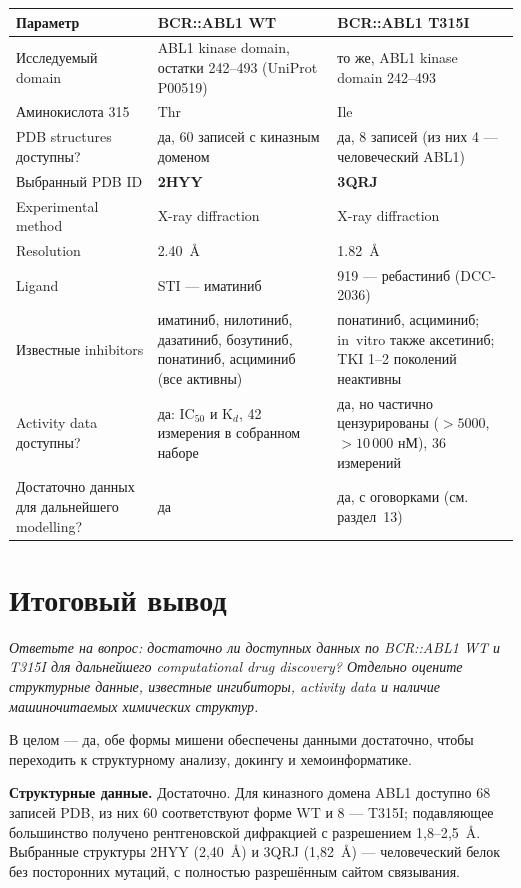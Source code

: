 \documentclass[11pt,a4paper]{article}
\newcommand{\instr}[1]{{\small\itshape #1\par}}
\begin{document}
\begin{center}
\begin{tabular}{|L{4.3cm}|L{5.4cm}|L{5.4cm}|}
\hline
\textbf{Параметр} & \textbf{BCR::ABL1 WT} & \textbf{BCR::ABL1 T315I} \\
\hline
Исследуемый domain & ABL1 kinase domain, остатки 242--493 (UniProt P00519) &
то же, ABL1 kinase domain 242--493 \\
\hline
Аминокислота 315 & Thr & Ile \\
\hline
PDB structures доступны? & да, 60 записей с киназным доменом &
да, 8 записей (из них 4 --- человеческий ABL1) \\
\hline
Выбранный PDB ID & \textbf{2HYY} & \textbf{3QRJ} \\
\hline
Experimental method & X-ray diffraction & X-ray diffraction \\
\hline
Resolution & 2.40~\AA & 1.82~\AA \\
\hline
Ligand & STI --- иматиниб & 919 --- ребастиниб (DCC-2036) \\
\hline
Известные inhibitors & иматиниб, нилотиниб, дазатиниб, бозутиниб, понатиниб, асциминиб
(все активны) & понатиниб, асциминиб; in~vitro также аксетиниб; TKI 1--2 поколений
неактивны \\
\hline
Activity data доступны? & да: IC$_{50}$ и K$_d$, 42 измерения в собранном наборе &
да, но частично цензурированы ($>5000$, $>10\,000$ нМ), 36 измерений \\
\hline
Достаточно данных для дальнейшего modelling? & да & да, с оговорками (см. раздел~13) \\
\hline
\end{tabular}
\end{center}

\section{Итоговый вывод}
\instr{Ответьте на вопрос: достаточно ли доступных данных по BCR::ABL1 WT и T315I для
дальнейшего computational drug discovery? Отдельно оцените структурные данные, известные
ингибиторы, activity data и наличие машиночитаемых химических структур.}

В целом --- да, обе формы мишени обеспечены данными достаточно, чтобы переходить к
структурному анализу, докингу и хемоинформатике.

\textbf{Структурные данные.} Достаточно. Для киназного домена ABL1 доступно 68 записей
PDB, из них 60 соответствуют форме WT и 8 --- T315I; подавляющее большинство получено
рентгеновской дифракцией с разрешением 1{,}8--2{,}5~\AA. Выбранные структуры 2HYY
(2{,}40~\AA) и 3QRJ (1{,}82~\AA) --- человеческий белок без посторонних мутаций, с
полностью разрешённым сайтом связывания.
\end{document}
